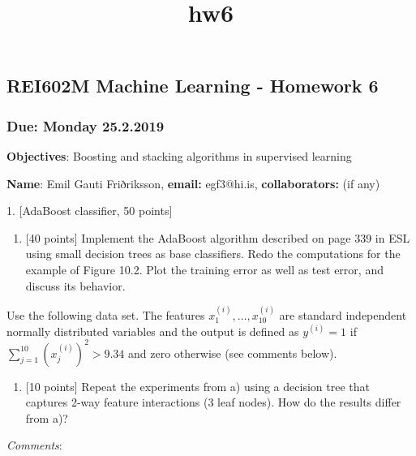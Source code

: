 \documentclass[11pt]{article}
\title{hw6}
\providecommand{\tightlist}{%
      \setlength{\itemsep}{0pt}\setlength{\parskip}{0pt}}
\begin{document}
    
    
    \maketitle
    
    

    
    \subsection{REI602M Machine Learning - Homework
6}\label{rei602m-machine-learning---homework-6}

\subsubsection{Due: Monday 25.2.2019}\label{due-monday-25.2.2019}

\textbf{Objectives}: Boosting and stacking algorithms in supervised
learning

\textbf{Name}: Emil Gauti Friðriksson, \textbf{email: } egf3@hi.is,
\textbf{collaborators:} (if any)

    1. {[}AdaBoost classifier, 50 points{]}

\begin{enumerate}
\def\labelenumi{\alph{enumi})}
\tightlist
\item
  {[}40 points{]} Implement the AdaBoost algorithm described on page 339
  in ESL using small decision trees as base classifiers. Redo the
  computations for the example of Figure 10.2. Plot the training error
  as well as test error, and discuss its behavior.
\end{enumerate}

Use the following data set. The features
\(x_1^{(i)},\ldots,x_{10}^{(i)}\) are standard independent normally
distributed variables and the output is defined as \(y^{(i)}=1\) if
\(\sum_{j=1}^{10} (x^{(i)}_j)^2 > 9.34\) and zero otherwise (see
comments below).

\begin{enumerate}
\def\labelenumi{\alph{enumi})}
\setcounter{enumi}{1}
\tightlist
\item
  {[}10 points{]} Repeat the experiments from a) using a decision tree
  that captures 2-way feature interactions (3 leaf nodes). How do the
  results differ from a)?
\end{enumerate}

\emph{Comments}:
\end{document}
